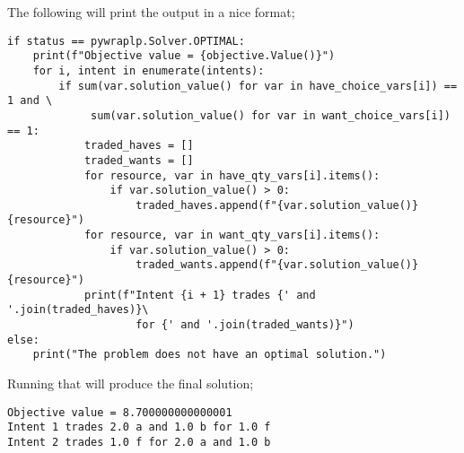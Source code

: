 The following will print the output in a nice format;

\begin{verbatim}
if status == pywraplp.Solver.OPTIMAL:
    print(f"Objective value = {objective.Value()}")
    for i, intent in enumerate(intents):
        if sum(var.solution_value() for var in have_choice_vars[i]) == 1 and \
             sum(var.solution_value() for var in want_choice_vars[i]) == 1:
            traded_haves = []
            traded_wants = []
            for resource, var in have_qty_vars[i].items():
                if var.solution_value() > 0:
                    traded_haves.append(f"{var.solution_value()} {resource}")
            for resource, var in want_qty_vars[i].items():
                if var.solution_value() > 0:
                    traded_wants.append(f"{var.solution_value()} {resource}")
            print(f"Intent {i + 1} trades {' and '.join(traded_haves)}\
                    for {' and '.join(traded_wants)}")
else:
    print("The problem does not have an optimal solution.")
\end{verbatim}

Running that will produce the final solution;

\begin{lstlisting}
Objective value = 8.700000000000001
Intent 1 trades 2.0 a and 1.0 b for 1.0 f
Intent 2 trades 1.0 f for 2.0 a and 1.0 b
\end{lstlisting}